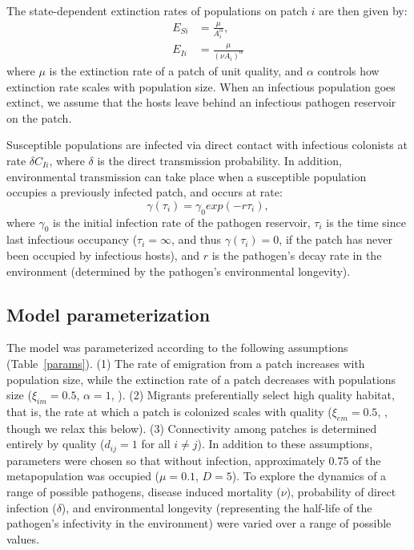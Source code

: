 \documentclass{article}
\begin{document}
The state-dependent extinction rates of populations on patch $i$ are then given by:
\begin{align}
E_{Si} & =\frac{\mu}{A_i^\alpha},\\
E_{Ii} & = \frac{\mu}{(\nu A_i) ^ \alpha}
\end{align}
where $\mu$ is the extinction rate of a patch of unit quality, and $\alpha$ controls how extinction rate scales with population size.  When an infectious population goes extinct, we assume that the hosts leave behind an infectious pathogen reservoir on the patch.  

Susceptible populations are infected via direct contact with infectious colonists at rate $\delta C_{Ii}$, where $\delta$ is the direct transmission probability.  In addition, environmental transmission can take place when a susceptible population occupies a previously infected patch, and occurs at rate:
\begin{equation}
\gamma(\tau_i)=\gamma_0exp(-r\tau_{i}),
\end{equation}
where $\gamma_0$ is the initial infection rate of the pathogen reservoir, $\tau_{i}$ is the time since last infectious occupancy ($\tau_{i} = \infty$, and thus $\gamma(\tau_i) = 0$, if the patch has never been occupied by infectious hosts), and $r$ is the pathogen's decay rate in the environment (determined by the pathogen's environmental longevity).

\subsection{Model parameterization}

The model was parameterized  according to the following assumptions (Table~\ref{params}). 
(1) The rate of emigration from a patch increases with population size, while the extinction rate of a patch decreases with populations size ($\xi_{im}=0.5$, $\alpha=1$, \cite{Hanski2003}).  
(2) Migrants preferentially select high quality habitat, that is, the rate at which a patch is colonized scales with quality ($\xi_{em}=0.5$, \cite{Hanski2003}, though we relax this below).  
(3)  Connectivity among patches is determined entirely by quality ($d_{ij}=1$ for all $i \neq j$).  
In addition to these assumptions, parameters were chosen so that without infection, approximately 0.75 of the metapopulation was occupied ($\mu = 0.1$, $D=5$).  To explore the dynamics of a range of possible pathogens, disease induced mortality ($\nu$), probability of direct infection ($\delta$), and environmental longevity (representing the half-life of the pathogen's infectivity in the environment) were varied over a range of possible values.
\end{document}
